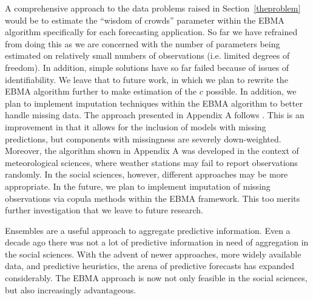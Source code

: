 \documentclass[12pt,fullpage,endnotes]{article}
\begin{document}
A comprehensive approach to the data problems raised in
Section~\ref{theproblem} would be to estimate the ``wisdom of crowds''
parameter within the EBMA algorithm specifically for each forecasting
application. So far we have refrained from doing this as we are
concerned with the number of parameters being estimated on relatively
small numbers of observations (i.e. limited degrees of freedom). In
addition, simple solutions have so far failed because of issues of
identifiability. We leave that to future work, in which we plan to
rewrite the EBMA algorithm further to make estimation of the $c$
possible.
In addition, we plan to implement imputation techniques within the
EBMA algorithm to better handle missing data. The approach presented
in Appendix A follows \citet{Fraley:2010}.  This is an improvement in
that it allows for the inclusion of models with missing predictions,
but components with missingness are severely down-weighted. Moreover,
the algorithm shown in Appendix A was developed in the context of
meteorological sciences, where weather stations may fail to report
observations randomly. In the social sciences, however, different
approaches may be more appropriate. In the future, we plan to
implement imputation of missing observations via copula methods within
the EBMA framework. This too merits further investigation that we
leave to future research.

Ensembles are a useful approach to aggregate predictive
information. Even a decade ago there was not a lot of predictive
information in need of aggregation in the social sciences. With the
advent of newer approaches, more widely available data, and predictive
heuristics, the arena of predictive forecasts has expanded
considerably. The EBMA approach is now not only feasible in the social
sciences, but also increasingly advantageous.

\singlespacing


\end{document}
